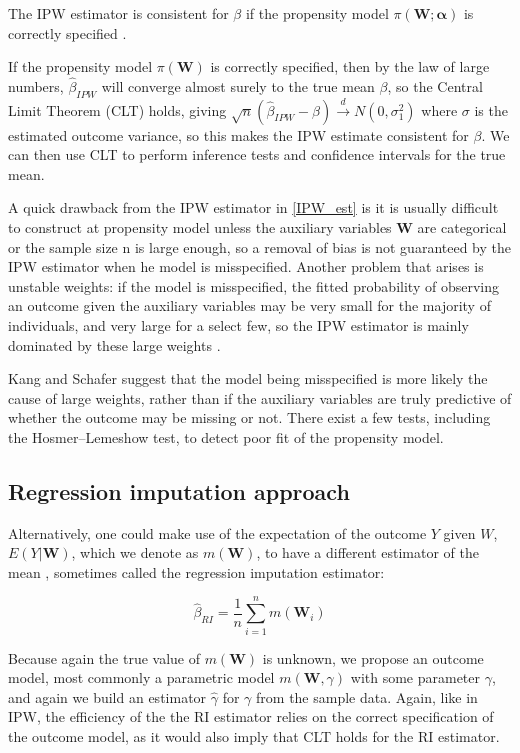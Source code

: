 \documentclass[12pt,twoside]{article}
\begin{document}
The IPW estimator is consistent for $\beta$ if the propensity model $\pi(\mathbf{W}; \boldsymbol\alpha)$ is correctly specified \cite{davidian}. 

If the propensity model $\pi(\mathbf{W})$ is correctly specified, then by the law of large numbers, $\hat{\beta}_{IPW}$ will converge almost surely to the true mean $\beta$, so the Central Limit Theorem (CLT) holds, giving $\sqrt{n}(\hat{\beta}_{IPW}-\beta) \xrightarrow{d} N(0,\sigma_1^2)$ where $\sigma$ is the estimated outcome variance, so this makes the IPW estimate consistent for $\beta$. We can then use CLT to perform inference tests and confidence intervals for the true mean.

A quick drawback from the IPW estimator in \ref{IPW_est} is it is usually difficult to construct at propensity model unless the auxiliary variables $\mathbf{W}$ are categorical or the sample size n is large enough, so a removal of bias is not guaranteed by the IPW estimator when he model is misspecified. Another problem that arises is unstable weights: if the model is misspecified, the fitted probability of observing an outcome given the auxiliary variables may be very small for the majority of individuals, and very large for a select few, so the IPW estimator is mainly dominated by these large weights \cite{seaman}.

Kang and Schafer \cite{kang} suggest that the model being misspecified is more likely the cause of large weights, rather than if the auxiliary variables are truly predictive of whether the outcome may be missing or not. There exist a few tests, including the Hosmer–Lemeshow \cite{hosmer} test, to detect poor fit of the propensity model.\\

\subsection{Regression imputation approach} 

Alternatively, one could make use of the expectation of the outcome $Y$ given $W$, $E(Y|\mathbf{W})$, which we denote as $m(\mathbf{W})$, to have a different estimator of the mean \cite{davidian,vansteelandt}, sometimes called the regression imputation estimator: 

\begin{equation}
    \hat{\beta}_ {RI} = \frac{1}{n}\sum_{i = 1}^n m(\mathbf{W}_i)
\end{equation}

Because again the true value of $m(\mathbf{W})$ is unknown, we propose an outcome model, most commonly a parametric model $m(\mathbf{W}, \gamma)$ with some parameter $\gamma$, and again we build an estimator $\hat{\gamma}$ for $\gamma$ from the sample data. Again, like in IPW, the efficiency of the the RI estimator relies on the correct specification of the outcome model, as it would also imply that CLT holds for the RI estimator. \\
\end{document}
